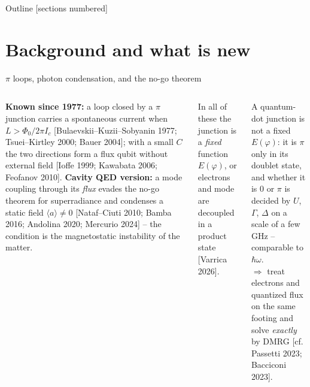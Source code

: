 \documentclass[aspectratio=169,9pt]{beamer}
\newcommand{\hw}{\hbar\omega}
\renewcommand{\cite}[1]{{\scriptsize\textcolor{ink!60}{[#1]}}}
\begin{document}
\begin{frame}{Outline}
  [sections numbered]
  \tableofcontents
\end{frame}

\section{Background and what is new}

\begin{frame}{$\pi$ loops, photon condensation, and the no-go theorem}
  \begin{columns}[T]
    \textbf{Known since 1977:} a loop closed by a $\pi$ junction carries a spontaneous current when
    $L>\Phi_0/2\pi I_c$ \cite{Bulaevskii--Kuzii--Sobyanin 1977; Tsuei--Kirtley 2000; Bauer 2004}; with a small $C$
    the two directions form a flux qubit without external field \cite{Ioffe 1999; Kawabata 2006; Feofanov 2010}.
    \vspace{1mm}
    \textbf{Cavity QED version:} a mode coupling through its \emph{flux} evades the no-go theorem for superradiance
    and condenses a static field $\langle a\rangle\neq0$ \cite{Nataf--Ciuti 2010; Bamba 2016; Andolina 2020; Mercurio 2024}
    -- the condition is the magnetostatic instability of the matter.
    \begin{keybox}[title={What was missing}]
      \small In all of these the junction is a \emph{fixed} function $E(\varphi)$, or electrons and mode are decoupled
      in a product state \cite{Varrica 2026}.
    \end{keybox}
    \begin{keybox}[title={This work}]
      \small A \alert{quantum-dot} junction is not a fixed $E(\varphi)$: it is $\pi$ only in its doublet state, and
      whether it is $0$ or $\pi$ is decided by $U$, $\Gamma$, $\Delta$ on a scale of a few GHz -- comparable to $\hw$.\\[1mm]
      $\Rightarrow$ treat electrons and quantized flux on the same footing and solve \emph{exactly} by DMRG
      \cite{cf. Passetti 2023; Bacciconi 2023}.
    \end{keybox}
  \end{columns}
\end{frame}
\end{document}
